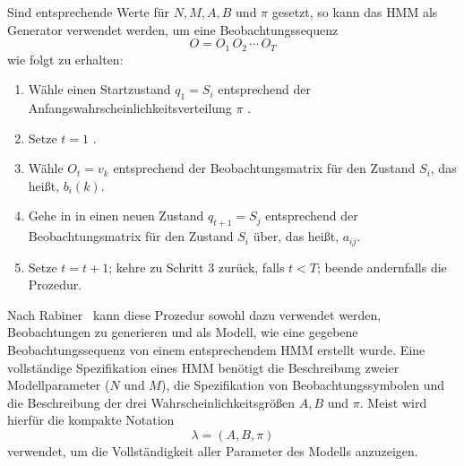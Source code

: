 Sind entsprechende Werte f\"ur $N, M, A, B$ und $\pi$ gesetzt, so kann das \acrshort{HMM} als Generator verwendet werden, um eine Beobachtungssequenz 
\begin{equation}
O = O_1 \, O_2 \, \cdots \, O_T
\end{equation}
wie folgt zu erhalten:
\begin{enumerate}
\item W\"ahle einen Startzustand $q_1 = S_i$ entsprechend der Anfangswahrscheinlichkeitsverteilung $\pi$ .
\item Setze $t = 1$ .
\item W\"ahle $O_t = v_k$ entsprechend der Beobachtungsmatrix f\"ur den Zustand $S_i$, das hei\ss t, $b_i(k)$.
\item Gehe in in einen neuen Zustand $q_{t+1} = S_j$ entsprechend der Beobachtungsmatrix f\"ur den Zustand $S_i$ \"uber, das hei\ss t, $a_{ij}$.
\item Setze $t = t+ 1$; kehre zu Schritt 3 zur\"uck, falls $t < T$; beende andernfalls die Prozedur.
\end{enumerate}
Nach Rabiner~\cite[S. 5]{bib:hmmrabiner} kann diese Prozedur sowohl dazu verwendet werden, Beobachtungen zu generieren und als Modell, wie eine gegebene Beobachtungssequenz von einem entsprechendem \acrshort{HMM} erstellt wurde.
\newline
Eine vollst\"andige Spezifikation eines \acrshort{HMM} ben\"otigt die Beschreibung zweier Modellparameter ($N$ und $M$), die Spezifikation von Beobachtungssymbolen und die Beschreibung der drei Wahrscheinlichkeitsgr\"o\ss en $A, B$ und $\pi$.
Meist wird hierf\"ur die kompakte Notation
\begin{equation}
\lambda = (A, B, \pi)
\end{equation}
verwendet, um die Vollst\"andigkeit aller Parameter des Modells anzuzeigen.

